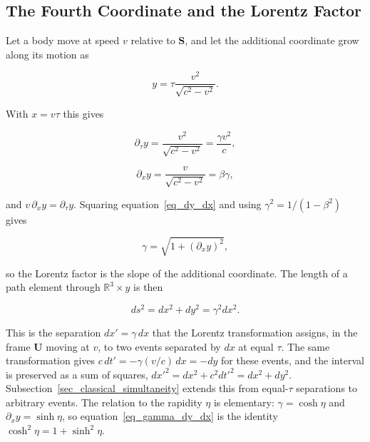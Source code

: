 \documentclass{iopjournal}
\begin{document}
\subsection{The Fourth Coordinate and the Lorentz Factor}\label{sec_fourth_coordinate}

Let a body move at speed $v$ relative to $\mathbf{S}$, and let the additional coordinate grow along its motion as

\begin{equation}\label{eq_dy_definition}
    y=\tau\frac{v^2}{\sqrt{c^2-v^2}} .
\end{equation}

With $x=v\tau$ this gives

\begin{equation}\label{eq_dy_dtau}
    \partial_\tau y=\frac{v^2}{\sqrt{c^2-v^2}}=\frac{\gamma v^2}{c},
\end{equation}

\begin{equation}\label{eq_dy_dx}
    \partial_x y=\frac{v}{\sqrt{c^2-v^2}}=\beta\gamma ,
\end{equation}

and $v\,\partial_x y=\partial_\tau y$. Squaring equation~\eqref{eq_dy_dx} and using $\gamma^2=1/(1-\beta^2)$ gives

\begin{equation}\label{eq_gamma_dy_dx}
    \gamma=\sqrt{1+\left(\partial_x y\right)^2},
\end{equation}

so the Lorentz factor is the slope of the additional coordinate. The length of a path element through $\mathbb{R}^3\times y$ is then

\begin{equation}\label{eq_path_length}
    ds^2=dx^2+dy^2=\gamma^2dx^2 .
\end{equation}

This is the separation $dx'=\gamma\,dx$ that the Lorentz transformation assigns, in the frame $\mathbf{U}$ moving at $v$, to two events separated by $dx$ at equal $\tau$. The same transformation gives $c\,dt'=-\gamma(v/c)\,dx=-dy$ for these events, and the interval is preserved as a sum of squares, $dx'^2=dx^2+c^2dt'^2=dx^2+dy^2$. Subsection~\ref{sec_classical_simultaneity} extends this from equal-$\tau$ separations to arbitrary events. The relation to the rapidity $\eta$ is elementary: $\gamma=\cosh\eta$ and $\partial_x y=\sinh\eta$, so equation~\eqref{eq_gamma_dy_dx} is the identity $\cosh^2\eta=1+\sinh^2\eta$.
\end{document}
